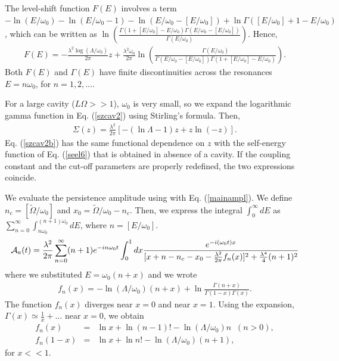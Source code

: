 \documentclass[12pt]{article}
\numberwithin{equation}{section}
\begin{document}
 The level-shift function $F(E)$ involves a term $ - \ln(E/\omega_0) -   \ln(E/\omega_0 - 1) - \ln(E/\omega_0 - [E/\omega_0]) + \ln \Gamma( [E/\omega_0] + 1 -  E/\omega_0)$, which can be written as
$ \ln \left( \frac{\Gamma(1+ [E/\omega_0] - E/\omega_0)   \Gamma(E/\omega_0 - [E/\omega_0]) }{ \Gamma(E/\omega_0) }\right)$. Hence,
  \begin{eqnarray}
  F(E) =   - \frac{\lambda^2\log (\Lambda/\omega_0) }{2\pi}z + \frac{\lambda^2\omega_0 }{2\pi} \ln \left( \frac{ \Gamma(E/\omega_0) }{ \Gamma(E/\omega_0 - [E/\omega_0])\Gamma(1+ [E/\omega_0] - E/\omega_0)  }\right).
  \end{eqnarray}
  Both $F(E)$ and $\Gamma(E)$ have finite  discontinuities across the resonances $E = n \omega_0$, for $n = 1, 2, \ldots$.



\medskip

 For a large cavity ($L \Omega >>1$), $\omega_0$ is very small, so we expand the logarithmic gamma function in Eq. (\ref{szcav2}) using  Stirling's formula. Then,
\begin{eqnarray}
\Sigma(z) =   \frac{\lambda^2  }{2\pi}\left[ - ( \ln \Lambda - 1)z + z \ln(-z) \right] . \label{szcav2b}
\end{eqnarray}
Eq. (\ref{szcav2b}) has the same functional dependence on $z$ with the self-energy function of Eq. (\ref{seel6})   that is obtained in absence of a cavity. If the coupling constant and the cut-off parameters are properly redefined, the two expressions coincide.

\medskip

We evaluate the persistence amplitude using with Eq. (\ref{mainampl}). We define $n_c = [\tilde{\Omega}/\omega_0] $ and $x_0 = \tilde{\Omega}/\omega_0 - n_c $. Then, we express the integral $\int_0^{\infty} dE$   as $\sum_{n=0}^{\infty} \int_{n \omega_0}^{(n+1)\omega_0}dE$, where $n = [E/\omega_0]$.
\begin{eqnarray}
{\cal A}_a(t) = \frac{\lambda^2  }{2 \pi} \sum_{n=0}^{\infty}(n+1)e^{-i n \omega_0 t} \int_0^1 dx \frac{e^{-i(\omega_0t)x}}{[x + n - n_c - x_0 - \frac{\lambda^2 }{2\pi} f_n(x)]^2 + \frac{\lambda^4 }{4}(n+1)^2 } \label{offres}
\end{eqnarray}
 where we substituted $ E = \omega_0(n+x)$ and we wrote
\begin{eqnarray}
f_n(x) =   - \ln(\Lambda/\omega_0) (n +x)  + \ln \frac{ \Gamma(n+x)}{\Gamma(1-x)\Gamma(x)}.
\end{eqnarray}
The function $f_n(x)$ diverges near $x = 0$ and near $x = 1$. Using the expansion,  $\Gamma(x) \simeq \frac{1}{x}  + \ldots$ near $x = 0$, we obtain
\begin{eqnarray}
f_n(x) &=&   \ln x  + \ln (n-1)! -   \ln(\Lambda/\omega_0) n \; \; (n > 0), \label{fn0}
\\ f_n(1-x) &=& \ln x + \ln n! -   \ln(\Lambda/\omega_0) (n+1), \label{fn1}
\end{eqnarray}
for $x << 1$.
\end{document}
